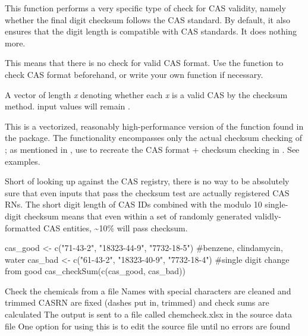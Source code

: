 \documentclass[letterpaper]{book}
\begin{document}
%
\begin{Details}\relax
This function performs a very specific type of check for CAS validity, namely whether the final digit checksum follows
the CAS standard. By default, it also ensures that the digit length is compatible with CAS standards. It does nothing
more.

This means that there is no check for valid CAS format. Use the  function to check CAS
format beforehand, or write your own function if necessary.
\end{Details}
%
\begin{Value}
A  vector of length \emph{x} denoting whether each \emph{x} is a valid CAS by the checksum method. 
input values will remain .
\end{Value}
%
\begin{Note}\relax
This is a vectorized, reasonably high-performance version of the  function found
in the  package. The functionality encompasses only the actual checksum checking of ;
as mentioned in , use  to recreate the CAS format + checksum checking in
. See examples.

Short of looking up against the CAS registry, there is no way to be absolutely sure that even inputs that pass
the checksum test are actually registered CAS RNs. The short digit length of CAS IDs combined with the modulo 10 single-
digit checksum means that even within a set of randomly generated validly-formatted CAS entities, \textasciitilde{}10\% will pass checksum.
\end{Note}
%
\begin{Examples}
\begin{ExampleCode}
cas_good <- c("71-43-2", "18323-44-9", "7732-18-5") #benzene, clindamycin, water
cas_bad  <- c("61-43-2", "18323-40-9", "7732-18-4") #single digit change from good
cas_checkSum(c(cas_good, cas_bad))
\end{ExampleCode}
\end{Examples}
%
\begin{Description}\relax
Check the chemicals from a file
Names with special characters are cleaned and trimmed
CASRN are fixed (dashes put in, trimmed) and check sums are calculated
The output is sent to a file called chemcheck.xlsx in the source data file
One option for using this is to edit the source file until no errors are found
\end{Description}
\end{document}
